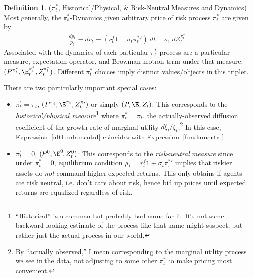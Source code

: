 \documentclass[12pt]{article}
\theoremstyle{plain}
\theoremstyle{definition}
\newtheorem{defn}[thm]{Definition}
\theoremstyle{remark}
\begin{document}
\begin{defn}
($\pi^*_t$, Historical/Physical, \& Risk-Neutral Measures and Dynamics)
Most generally, the $\pi^*_t$-Dynamics given arbitrary price of risk
process $\pi_t^*$ are given by
\begin{align}
  \frac{dp_t}{p_t}
  =
  dr_t=(r_t^f\mathbf{1}+\sigma_t{\pi_t^*}{}')\;dt
  + \sigma_t\;dZ_t^{\pi^*_t}
  \label{altfundamental}
\end{align}
Associated with the dynamics of each particular $\pi_t^*$ process are a
particular measure, expectation operator, and Brownian motion term under
that measure: $(P^{\pi_t^*},\E_t^{\pi_t^*},Z_t^{\pi_t^*})$.
Different $\pi_t^*$ choices imply distinct values/objects in this
triplet.

There are two particularly important special cases:
\begin{itemize}
  \item $\pi_t^*=\pi_t$,
    $(P^{\pi_t},\E^{\pi_t},Z_t^{\pi_t})$ or simply
    $(P,\E,Z_t)$:
    This corresponds to the
    \emph{historical/physical measure}\footnote{%
      ``Historical'' is a common but probably bad name for it.
      It's not some backward looking estimate of the process like that
      name might suspect, but rather just the actual process in our
      world.
    }
    where $\pi_t^*=\pi_t$, the actually-observed diffusion
    coefficient of the growth rate of marginal utility
    $d\xi_t/\xi_t$.\footnote{%
      By ``actually observed,'' I mean corresponding to the marginal
      utility process we see in the data, not adjusting to some other
      $\pi_t^*$ to make pricing most convenient.
    }
    In this case, Expression~\ref{altfundamental} coincides with
    Expression~\ref{fundamental}.

  \item
    $\pi_t^*=0$,  $(P^0,\E^0,Z_t^0)$:
    This corresponds to the \emph{risk-neutral measure} since under
    $\pi_t^*=0$, equilibrium condition
    $\mu_t=r_t^f\mathbf{1}+\sigma_t\pi_t^*{}'$ implies that riskier
    assets do \emph{not} command higher expected returns.
    This only obtains if agents are risk neutral, i.e. don't care about
    risk, hence bid up prices until expected returns are equalized
    regardless of risk.
\end{itemize}
\end{defn}
\end{document}
